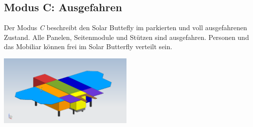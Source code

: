 

\subsection{Modus C: Ausgefahren}
Der Modus \emph{C} beschreibt den Solar Buttefly im parkierten und voll ausgefahrenen Zustand. Alle Panelen, Seitenmodule und Stützen sind ausgefahren. Personen und das Mobiliar können frei im Solar Butterfly verteilt sein.\\

\begin{center}
  \includegraphics[width=0.5\textwidth]{04_Figures/C.png}
  \label{Modus C}
\end{center}

